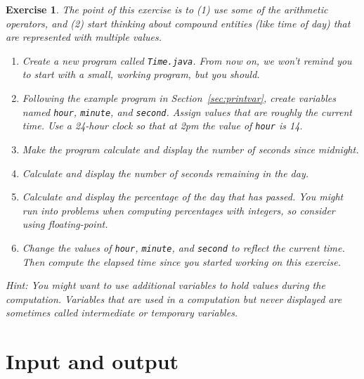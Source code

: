 \documentclass[12pt]{book}
\theoremstyle{exercise}
\newtheorem{exercise}{Exercise}[chapter]
\newcommand{\java}[1]{\verb"#1"}
\begin{document}
\begin{exercise}

The point of this exercise is to (1) use some of the arithmetic operators, and (2) start thinking about compound entities (like time of day) that are represented with multiple values.

\begin{enumerate}

\item Create a new program called {\tt Time.java}.
From now on, we won't remind you to start with a small, working program, but you should.

\item Following the example program in Section~\ref{sec:printvar}, create variables named \java{hour}, \java{minute}, and \java{second}.
Assign values that are roughly the current time.
Use a 24-hour clock so that at 2pm the value of \java{hour} is 14.

\item Make the program calculate and display the number of seconds since midnight.

\item Calculate and display the number of seconds remaining in the day.

\item Calculate and display the percentage of the day that has passed.
You might run into problems when computing percentages with integers, so consider using floating-point.

\item Change the values of \java{hour}, \java{minute}, and \java{second} to reflect the current time.
Then compute the elapsed time since you started working on this exercise.

\end{enumerate}

Hint: You might want to use additional variables to hold values during the computation.
Variables that are used in a computation but never displayed are sometimes called intermediate or {\em temporary} variables.

\end{exercise}


\chapter{Input and output}

\end{document}
